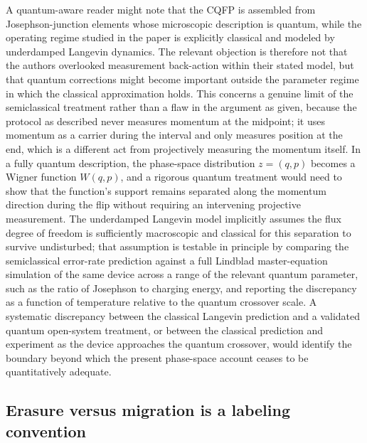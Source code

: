 \documentclass[11pt]{article}
\begin{document}
A quantum-aware reader might note that the CQFP is assembled from Josephson-junction elements whose microscopic description is quantum, while the operating regime studied in the paper is explicitly classical and modeled by underdamped Langevin dynamics. The relevant objection is therefore not that the authors overlooked measurement back-action within their stated model, but that quantum corrections might become important outside the parameter regime in which the classical approximation holds. This concerns a genuine limit of the semiclassical treatment rather than a flaw in the argument as given, because the protocol as described never measures momentum at the midpoint; it uses momentum as a carrier during the interval and only measures position at the end, which is a different act from projectively measuring the momentum itself. In a fully quantum description, the phase-space distribution $z=(q,p)$ becomes a Wigner function $W(q,p)$, and a rigorous quantum treatment would need to show that the function's support remains separated along the momentum direction during the flip without requiring an intervening projective measurement. The underdamped Langevin model implicitly assumes the flux degree of freedom is sufficiently macroscopic and classical for this separation to survive undisturbed; that assumption is testable in principle by comparing the semiclassical error-rate prediction against a full Lindblad master-equation simulation of the same device across a range of the relevant quantum parameter, such as the ratio of Josephson to charging energy, and reporting the discrepancy as a function of temperature relative to the quantum crossover scale. A systematic discrepancy between the classical Langevin prediction and a validated quantum open-system treatment, or between the classical prediction and experiment as the device approaches the quantum crossover, would identify the boundary beyond which the present phase-space account ceases to be quantitatively adequate.

\subsection{Erasure versus migration is a labeling convention}
\end{document}
